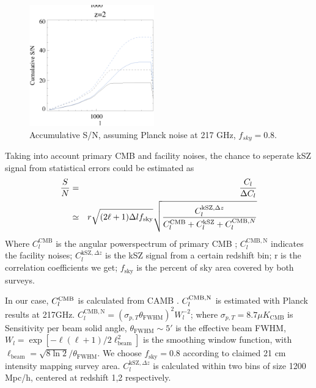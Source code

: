 \begin{figure}[tbp]
\begin{center}
\includegraphics[width=0.48\textwidth]{figure/sn_z1_z2.eps}
\end{center}
\vspace{-0.7cm}
\caption{Accumulative S/N, assuming Planck noise at 217 GHz, $f_{sky}=0.8$. 
}
\label{fig:sn}
\end{figure}
Taking into account primary CMB and facility noises, 
the chance to seperate kSZ signal from statistical errors could be estimated 
as
\begin{eqnarray}
    \frac{S}{N}&=&\frac{C_l}{\Delta C_l}\\\nonumber
               &\simeq&
    r\sqrt{(2\ell+1)\Delta l f_\mathrm{sky}}\sqrt{\frac{C_l^{\mathrm{kSZ},\Delta z}}{C_l^{\mathrm{CMB}}+C_l^\mathrm{kSZ}+C_l^{\mathrm{CMB},N}}}
\end{eqnarray}
Where $C_l^\mathrm{CMB}$ is the angular powerspectrum of primary CMB 
;
$C_l^\mathrm{CMB,N}$ indicates the facility noises; 
$C_l^{\mathrm{kSZ},\Delta z}$ is the kSZ signal from a certain redshift bin; 
r is the correlation coefficients we get; 
$f_\mathrm{sky}$ is the percent of sky area covered by both surveys.

In our case, $C_l^\mathrm{CMB}$ is calculated from CAMB \cite{CAMB}. 
$C_l^\mathrm{CMB,N}$ is estimated with Planck results \cite{Planck2015} at 217GHz.
$C_l^\mathrm{CMB,N}=(\sigma_{p,T}\theta_\mathrm{FWHM})^2W_l^{-2}$;  
where $\sigma_{p,T}=8.7\mu K_\mathrm{CMB}$ is Sensitivity per beam solid angle, 
$\theta_\mathrm{FWHM}\sim 5'$ is the effective beam FWHM, 
$W_l=\exp[-\ell(\ell+1)/2\ell^2_\mathrm{beam}]$ is the smoothing window function, 
with $\ell _\mathrm{beam}=\sqrt{8\ln2}/\theta_\mathrm{FWHM}$. 
We choose $f_\mathrm{sky}=0.8$ according to claimed 21 cm intensity mapping survey area. 
$C_l^{\mathrm{kSZ},\Delta z}$ is calculated within two bins of size 1200 Mpc/h, centered at redshift 1,2 respectively.

